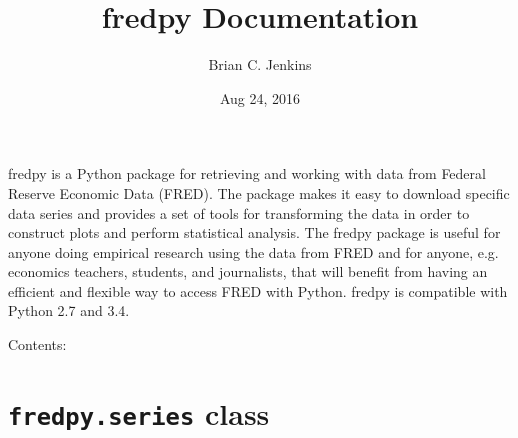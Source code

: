 \documentclass[letterpaper,10pt,english]{sphinxmanual}
\title{fredpy Documentation}
\date{Aug 24, 2016}
\author{Brian C. Jenkins}
\begin{document}
\maketitle
\tableofcontents
{}\label{index::doc}


fredpy is a Python package for retrieving and working with data from Federal Reserve Economic Data (FRED). The package makes it easy to download specific data series and provides a set of tools for transforming the data in order to construct plots and perform statistical analysis. The fredpy package is useful for anyone doing empirical research using the data from FRED and for anyone, e.g. economics teachers, students, and journalists, that will benefit from having an efficient and flexible way to access FRED with Python. fredpy is compatible with Python 2.7 and 3.4.

Contents:


\chapter{\texttt{fredpy.series} class}
\label{series_class::doc}\label{series_class:fredpy-documentation}\label{series_class:fredpy-series-class}
\end{document}
